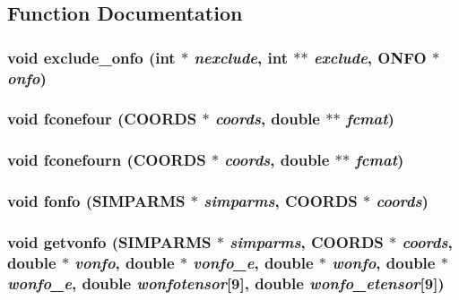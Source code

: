 \subsection{Function Documentation}
\subsubsection{\setlength{\rightskip}{0pt plus 5cm}void exclude\_\-onfo (int $\ast$ {\em nexclude}, int $\ast$$\ast$ {\em exclude}, {\bf ONFO} $\ast$ {\em onfo})}\label{md__fonefour_8c_dd78094ca7ff46304015091307dea9cb}


\subsubsection{\setlength{\rightskip}{0pt plus 5cm}void fconefour ({\bf COORDS} $\ast$ {\em coords}, double $\ast$$\ast$ {\em fcmat})}\label{md__fonefour_8c_e7037d31b0a0570e7018c57e20958007}


\subsubsection{\setlength{\rightskip}{0pt plus 5cm}void fconefourn ({\bf COORDS} $\ast$ {\em coords}, double $\ast$$\ast$ {\em fcmat})}\label{md__fonefour_8c_a31b2757ebb2ff6960bb8c9803e6e624}


\subsubsection{\setlength{\rightskip}{0pt plus 5cm}void fonfo ({\bf SIMPARMS} $\ast$ {\em simparms}, {\bf COORDS} $\ast$ {\em coords})}\label{md__fonefour_8c_de14f75bc960b1ad8d18f406e0e42e18}


\subsubsection{\setlength{\rightskip}{0pt plus 5cm}void getvonfo ({\bf SIMPARMS} $\ast$ {\em simparms}, {\bf COORDS} $\ast$ {\em coords}, double $\ast$ {\em vonfo}, double $\ast$ {\em vonfo\_\-e}, double $\ast$ {\em wonfo}, double $\ast$ {\em wonfo\_\-e}, double {\em wonfotensor}[9], double {\em wonfo\_\-etensor}[9])}\label{md__fonefour_8c_9f6802a276d607f912f36fae953481de}


